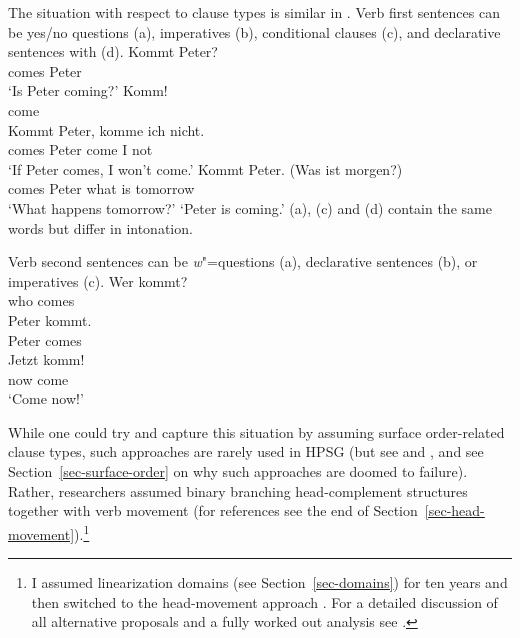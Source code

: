 \documentclass[output=paper,biblatex,babelshorthands,newtxmath,draftmode,colorlinks,citecolor=brown]{langscibook}
\begin{document}
The situation with respect to clause types is similar in . Verb first sentences can be
yes/no questions (a), imperatives (b), conditional clauses (c), and declarative
sentences with  (d). 
\eal
\ex\label{ex-kommt-peter-question}
\gll Kommt Peter?\\
     comes Peter\\\german
\glt `Is Peter coming?'
\ex 
\gll Komm!\\
     come\\
\ex\label{ex-kommt-peter-conditional}
\gll Kommt Peter, komme ich nicht.\\
     comes Peter  come  I not\\
\glt `If Peter comes, I won't come.'
\ex 
\gll Kommt Peter. (Was ist morgen?)\\
     comes Peter  \hphantom{(}what is tomorrow\\
\glt `What happens tomorrow?' `Peter is coming.'
\zl
(a), (c) and (d) contain the same words but differ in intonation.

Verb second sentences can be \emph{w}"=questions (a), declarative sentences (b), or imperatives (c).
\eal
\ex 
\gll Wer kommt?\\
     who comes\\\german
\ex 
\gll Peter kommt.\\
     Peter comes\\
\ex 
\gll Jetzt komm!\\
     now   come\\
\glt `Come now!'
\zl

\noindent
While one could try and capture this situation by assuming surface order-related clause types, such approaches are rarely
used in HPSG (but see  and , and see Section~\ref{sec-surface-order} on why such approaches
are doomed to failure). Rather, researchers assumed binary branching head-complement structures
together with verb movement (for references see the end of
Section~\ref{sec-head-movement}).\footnote{%
I assumed linearization domains (see Section~\ref{sec-domains}) for ten
years and then switched to the head-movement approach
\citep{Mueller2005c,Mueller2005d,MuellerGS}. For a detailed discussion of all alternative proposals
and a fully worked out analysis see .%
} 
\end{document}
